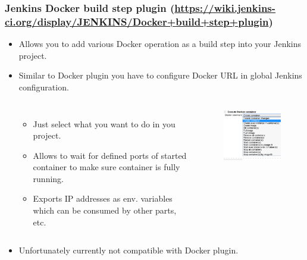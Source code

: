 \documentclass[10pt,utf8]{beamer}
\begin{document}
\begin{frame}
	\frametitle{Jenkins Docker build step plugin \scriptsize{(\href{https://wiki.jenkins-ci.org/display/JENKINS/Docker+build+step+plugin}{https://wiki.jenkins-ci.org/display/JENKINS/Docker+build+step+plugin})}}
	\begin{itemize}
		\item Allows you to add various Docker operation as a build step into your Jenkins project.
		\item Similar to Docker plugin you have to configure Docker URL in global Jenkins configuration.
		\begin{columns}
			\begin{itemize}
				\item Just select what you want to do in you project.
				\item Allows to wait for defined ports of started container to make sure container is fully running.
				\item Exports IP addresses as env. variables which can be consumed by other parts, etc.
			\end{itemize}
			\begin{figure}
				\centering
				\includegraphics[width=5.5cm]{./img/docker-build-step-cfg1.eps}
			\end{figure}
		\end{columns}
		\item Unfortunately currently not compatible with Docker plugin.
	\end{itemize}
\end{frame}
\end{document}

